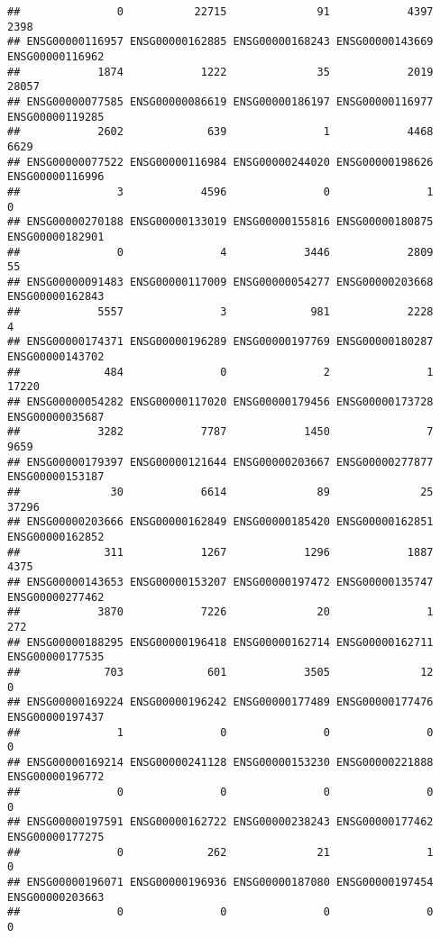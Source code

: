 \documentclass[
]{article}
\begin{document}
\begin{verbatim}
##               0           22715              91            4397            2398 
## ENSG00000116957 ENSG00000162885 ENSG00000168243 ENSG00000143669 ENSG00000116962 
##            1874            1222              35            2019           28057 
## ENSG00000077585 ENSG00000086619 ENSG00000186197 ENSG00000116977 ENSG00000119285 
##            2602             639               1            4468            6629 
## ENSG00000077522 ENSG00000116984 ENSG00000244020 ENSG00000198626 ENSG00000116996 
##               3            4596               0               1               0 
## ENSG00000270188 ENSG00000133019 ENSG00000155816 ENSG00000180875 ENSG00000182901 
##               0               4            3446            2809              55 
## ENSG00000091483 ENSG00000117009 ENSG00000054277 ENSG00000203668 ENSG00000162843 
##            5557               3             981            2228               4 
## ENSG00000174371 ENSG00000196289 ENSG00000197769 ENSG00000180287 ENSG00000143702 
##             484               0               2               1           17220 
## ENSG00000054282 ENSG00000117020 ENSG00000179456 ENSG00000173728 ENSG00000035687 
##            3282            7787            1450               7            9659 
## ENSG00000179397 ENSG00000121644 ENSG00000203667 ENSG00000277877 ENSG00000153187 
##              30            6614              89              25           37296 
## ENSG00000203666 ENSG00000162849 ENSG00000185420 ENSG00000162851 ENSG00000162852 
##             311            1267            1296            1887            4375 
## ENSG00000143653 ENSG00000153207 ENSG00000197472 ENSG00000135747 ENSG00000277462 
##            3870            7226              20               1             272 
## ENSG00000188295 ENSG00000196418 ENSG00000162714 ENSG00000162711 ENSG00000177535 
##             703             601            3505              12               0 
## ENSG00000169224 ENSG00000196242 ENSG00000177489 ENSG00000177476 ENSG00000197437 
##               1               0               0               0               0 
## ENSG00000169214 ENSG00000241128 ENSG00000153230 ENSG00000221888 ENSG00000196772 
##               0               0               0               0               0 
## ENSG00000197591 ENSG00000162722 ENSG00000238243 ENSG00000177462 ENSG00000177275 
##               0             262              21               1               0 
## ENSG00000196071 ENSG00000196936 ENSG00000187080 ENSG00000197454 ENSG00000203663 
##               0               0               0               0               0 

\end{verbatim}
\end{document}
